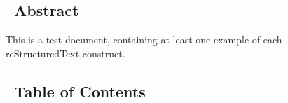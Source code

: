 \documentclass[10pt,a4paper,english]{article}
\begin{document}
\subsection*{~\hfill Abstract\hfill ~}

This is a test document, containing at least one example of each
reStructuredText construct.

\hypertarget{table-of-contents}{}
\subsection*{~\hfill Table of Contents\hfill ~}
\end{document}
